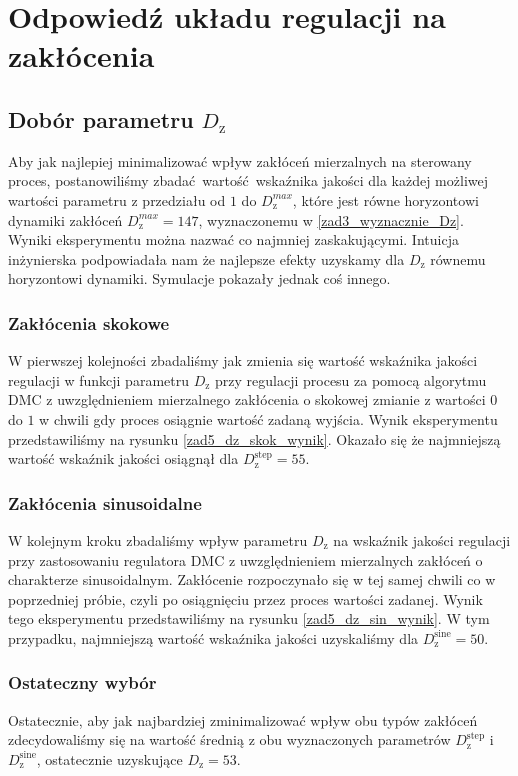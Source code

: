 \chapter{Odpowiedź układu regulacji na zakłócenia}
\label{zad5}

\section{Dobór parametru $D_{\mathrm{z}}$}   
\label{zad5_dz} 
Aby jak najlepiej minimalizować wpływ zakłóceń mierzalnych na sterowany 
proces, postanowiliśmy zbadać wartość wskaźnika jakości dla każdej możliwej
wartości parametru z przedziału od $\num{1}$ do $D_{\mathrm{z}}^{max}$,
które jest równe horyzontowi dynamiki zakłóceń $D_{\mathrm{z}}^{max} = \num{147}$,
wyznaczonemu w \ref{zad3_wyznacznie_Dz}. Wyniki eksperymentu można nazwać co najmniej
zaskakującymi. Intuicja inżynierska podpowiadała nam że najlepsze efekty uzyskamy dla 
$D_{\mathrm{z}}$ równemu horyzontowi dynamiki. Symulacje pokazały jednak coś innego.

\subsection{Zakłócenia skokowe}
\label{zad5_dz_skok}
W pierwszej kolejności zbadaliśmy jak zmienia się wartość wskaźnika jakości regulacji
w funkcji parametru $D_{\mathrm{z}}$ przy regulacji procesu za pomocą algorytmu DMC z uwzględnieniem 
mierzalnego zakłócenia o skokowej zmianie z wartości $\num{0}$
do $\num{1}$ w chwili gdy proces osiągnie wartość zadaną wyjścia. Wynik eksperymentu przedstawiliśmy 
na rysunku \ref{zad5_dz_skok_wynik}. Okazało się że najmniejszą wartość wskaźnik jakości osiągnął 
dla $D_{\mathrm{z}}^{\mathrm{step}} = \num{55}$. 

\subsection{Zakłócenia sinusoidalne}
W kolejnym kroku zbadaliśmy wpływ parametru $D_{\mathrm{z}}$ na wskaźnik jakości regulacji przy zastosowaniu
regulatora DMC z uwzględnieniem mierzalnych zakłóceń o charakterze sinusoidalnym. Zakłócenie rozpoczynało się 
w tej samej chwili co w poprzedniej próbie, czyli po osiągnięciu przez proces wartości zadanej. Wynik tego eksperymentu
przedstawiliśmy na rysunku \ref{zad5_dz_sin_wynik}. W tym przypadku, najmniejszą wartość wskaźnika jakości uzyskaliśmy
dla $D_{\mathrm{z}}^{\mathrm{sine}} = \num{50}$.

\subsection{Ostateczny wybór}
Ostatecznie, aby jak najbardziej zminimalizować wpływ obu typów zakłóceń zdecydowaliśmy się na wartość średnią
z obu wyznaczonych parametrów $D_{\mathrm{z}}^{\mathrm{step}}$ i $D_{\mathrm{z}}^{\mathrm{sine}}$, ostatecznie
uzyskujące $D_{\mathrm{z}} = \num{53}$.

